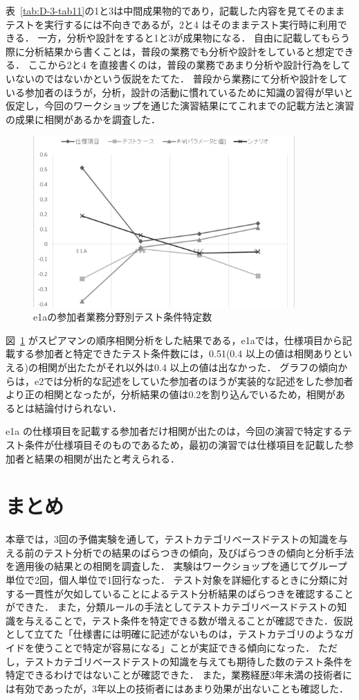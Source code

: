 表~\ref{tab:D-3-tab11}の1と3は中間成果物的であり，記載した内容を見てそのままテストを実行するには不向きであるが，2と4 はそのままテスト実行時に利用できる．
一方，分析や設計をすると1と3が成果物になる．
自由に記載してもらう際に分析結果から書くことは，普段の業務でも分析や設計をしていると想定できる．
ここから2と4 を直接書くのは，普段の業務であまり分析や設計行為をしていないのではないかという仮説をたてた．
普段から業務にて分析や設計をしている参加者のほうが，分析，設計の活動に慣れているために知識の習得が早いと仮定し，今回のワークショップを通じた演習結果にてこれまでの記載方法と演習の成果に相関があるかを調査した．

\begin{figure}[h]
  \begin{center}
  \includegraphics[width=10cm]{./image/D-3-Fig13.png}
  \caption{e1aの参加者業務分野別テスト条件特定数}
  \label{fig:D-3-Fig13}
  \end{center}
\end{figure}

図~\ref{fig:D-3-Fig13} がスピアマンの順序相関分析をした結果である，e1aでは，仕様項目から記載する参加者と特定できたテスト条件数には，0.51(0.4 以上の値は相関ありといえる)の相関が出たたがそれ以外は0.4 以上の値は出なかった．
グラフの傾向からは，e2では分析的な記述をしていた参加者のほうが実装的な記述をした参加者より正の相関となったが，分析結果の値は0.2を割り込んでいるため，相関があるとは結論付けられない．

e1a の仕様項目を記載する参加者だけ相関が出たのは，今回の演習で特定するテスト条件が仕様項目そのものであるため，最初の演習では仕様項目を記載した参加者と結果の相関が出たと考えられる．

\newpage
\section{まとめ}
本章では，3回の予備実験を通して，テストカテゴリベースドテストの知識を与える前のテスト分析での結果のばらつきの傾向，及びばらつきの傾向と分析手法を適用後の結果との相関を調査した．
実験はワークショップを通じてグループ単位で2回，個人単位で1回行なった．
テスト対象を詳細化するときに分類に対する一貫性が欠如していることによるテスト分析結果のばらつきを確認することができた．
また，分類ルールの手法としてテストカテゴリベースドテストの知識を与えることで，テスト条件を特定できる数が増えることが確認できた．仮説として立てた「仕様書には明確に記述がないものは，テストカテゴリのようなガイドを使うことで特定が容易になる」ことが実証できる傾向になった．
ただし，テストカテゴリベースドテストの知識を与えても期待した数のテスト条件を特定できるわけではないことが確認できた．
また，業務経歴3年未満の技術者には有効であったが，3年以上の技術者にはあまり効果が出ないことも確認した．

